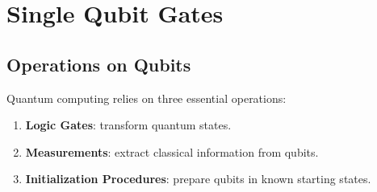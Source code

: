 \section{Single Qubit Gates}\label{sec:single-qubit-gates}

\subsection{Operations on Qubits}

Quantum computing relies on three essential operations:
\begin{enumerate}
    \item \textbf{Logic Gates}: transform quantum states.
    \item \textbf{Measurements}: extract classical information from qubits.
    \item \textbf{Initialization Procedures}: prepare qubits in known starting states.
\end{enumerate}

